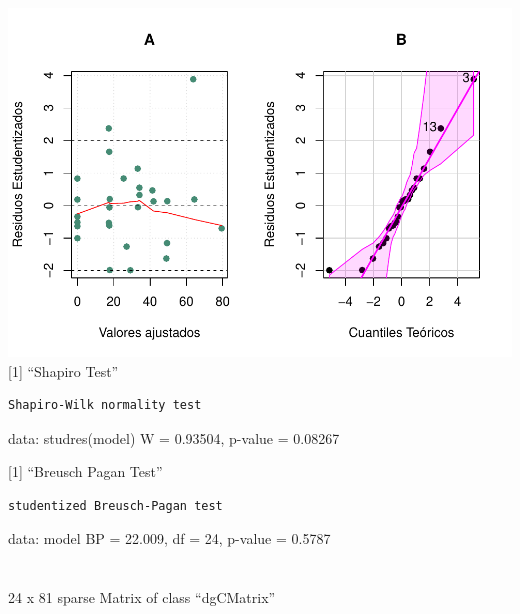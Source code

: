 \documentclass[
]{article}
\newenvironment{Shaded}{\begin{snugshade}}{\end{snugshade}}
\newcommand{\AttributeTok}[1]{\textcolor[rgb]{0.77,0.63,0.00}{#1}}
\newcommand{\DecValTok}[1]{\textcolor[rgb]{0.00,0.00,0.81}{#1}}
\newcommand{\FunctionTok}[1]{\textcolor[rgb]{0.00,0.00,0.00}{#1}}
\newcommand{\NormalTok}[1]{#1}
\newcommand{\OtherTok}[1]{\textcolor[rgb]{0.56,0.35,0.01}{#1}}
\newcommand{\SpecialCharTok}[1]{\textcolor[rgb]{0.00,0.00,0.00}{#1}}
\begin{document}
\includegraphics{Taller-2-Regresion-Multiple-Aplicada_files/figure-latex/unnamed-chunk-5-2.pdf}
{[}1{]} ``Shapiro Test''

\begin{verbatim}
Shapiro-Wilk normality test
\end{verbatim}

data: studres(model) W = 0.93504, p-value = 0.08267

{[}1{]} ``Breusch Pagan Test''

\begin{verbatim}
studentized Breusch-Pagan test
\end{verbatim}

data: model BP = 22.009, df = 24, p-value = 0.5787

\hypertarget{section}{%
\section{}\label{section}}

\begin{Shaded}
\end{Shaded}

24 x 81 sparse Matrix of class ``dgCMatrix''
\end{document}
